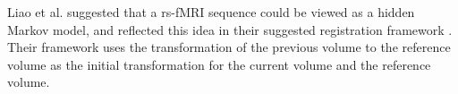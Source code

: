 Liao et al. suggested that a rs-fMRI sequence could be viewed as a hidden Markov model, and reflected this idea in their suggested registration framework \cite{Liao2016}. Their framework uses the transformation of the previous volume to the reference volume as the initial transformation for the current volume and the reference volume. 



%
%
%
%
%
%
%
%
%
%
